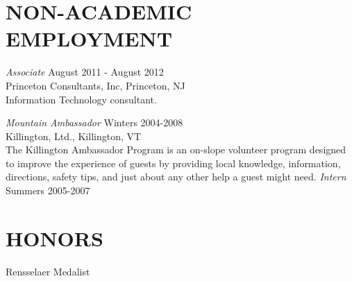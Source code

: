 \documentclass[line,margin]{res}
\begin{document}
\begin{resume}
                          \newpage
                          \section{NON-ACADEMIC\\EMPLOYMENT}             
                                  {\sl Associate} \hfill August 2011 - August 2012\\
                                  Princeton Consultants, Inc, Princeton, NJ\\
                                  Information Technology consultant.

                                  {\it Mountain Ambassador} \hfill Winters 2004-2008\\
                                  Killington, Ltd., Killington, VT \\
                                  The Killington Ambassador Program is an on-slope volunteer program
                                  designed to improve the experience of guests by providing local knowledge, 
                                  information, directions, safety tips, and just about any other help a guest might need.
                                  {\sl Intern} \hfill            Summers 2005-2007 \\

                                  
                                  \section{HONORS}
                                  Rensselaer Medalist
                                  

\end{resume}
\end{document}
